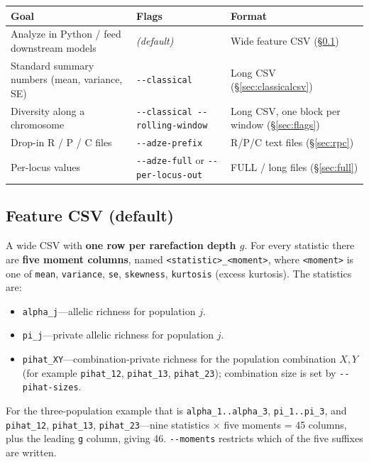 \documentclass[11pt]{article}
\begin{document}
\begin{center}
\begin{tabular}{@{}>{\raggedright\arraybackslash}p{}>{\raggedright\arraybackslash}p{}>{\raggedright\arraybackslash}p{}@{}}
\toprule
\textbf{Goal} & \textbf{Flags} & \textbf{Format} \\
\midrule
Analyze in Python / feed downstream models & \emph{(default)} & Wide feature CSV (\S\ref{sec:featurecsv}) \\
Standard summary numbers (mean, variance, SE) & \texttt{-{}-classical} & Long CSV (\S\ref{sec:classicalcsv}) \\
Diversity along a chromosome & \texttt{-{}-classical -{}-rolling-window} & Long CSV, one block per window (\S\ref{sec:flags}) \\
Drop-in R / P / C files & \texttt{-{}-adze-prefix} & R/P/C text files (\S\ref{sec:rpc}) \\
Per-locus values & \texttt{-{}-adze-full} or \texttt{-{}-per-locus-out} & FULL / long files (\S\ref{sec:full}) \\
\bottomrule
\end{tabular}
\end{center}

\subsection{Feature CSV (default)}
\label{sec:featurecsv}

A wide CSV with \textbf{one row per rarefaction depth \(g\)}. For every statistic
there are \textbf{five moment columns}, named \texttt{<statistic>\_<moment>},
where \texttt{<moment>} is one of \texttt{mean}, \texttt{variance}, \texttt{se},
\texttt{skewness}, \texttt{kurtosis} (excess kurtosis). The statistics are:
\begin{itemize}
  \item \texttt{alpha\_j}---allelic richness for population \(j\).
  \item \texttt{pi\_j}---private allelic richness for population \(j\).
  \item \texttt{pihat\_XY}---combination-private richness for the population
        combination \(X,Y\) (for example \texttt{pihat\_12}, \texttt{pihat\_13},
        \texttt{pihat\_23}); combination size is set by \texttt{-{}-pihat-sizes}.
\end{itemize}

For the three-population example that is \texttt{alpha\_1..alpha\_3},
\texttt{pi\_1..pi\_3}, and \texttt{pihat\_12}, \texttt{pihat\_13},
\texttt{pihat\_23}---nine statistics \(\times\) five moments = 45 columns, plus
the leading \texttt{g} column, giving 46. \texttt{-{}-moments} restricts which of
the five suffixes are written.
\end{document}
